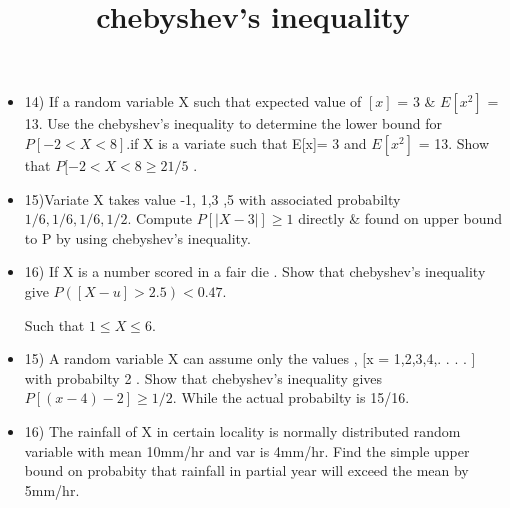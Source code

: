 \documentclass{article}
\begin{document}
\title{\Large chebyshev's inequality}

\begin{itemize}

    
    \item 14) If a random variable X such that expected value of $[x]$ = 3 & $E[x^2]$ = 13. Use the chebyshev's inequality to determine the lower bound for $P[ -2 < X < 8]$.if X is a variate such that E[x]= 3 and $E[x^2]$ = 13. Show that $P[-2 < X < 8 \geq 21/5$ . 

    \item 15)Variate X takes value -1, 1,3 ,5 with associated probabilty 
    $1/6, 1/6, 1/6, 1/2$. Compute $P[|X-3|] \geq 1$ directly & found on upper bound to P by using chebyshev's inequality.

    \item 16) If X is a number scored in a fair die . Show that chebyshev's inequality give $P([X-u] > 2.5) < 0.47$.

   Such that $1 \leq X \leq 6$.

   \item 15) A random variable X can assume only the values , [x = 1,2,3,4,. . . . ] with probabilty 2 . Show that chebyshev's inequality gives $P[(x-4)-2] \geq 1/2$. While the actual probabilty is 15/16. 

   \item  16) The rainfall of X in certain locality is normally distributed random variable with mean 10mm/hr and var is 4mm/hr. Find the simple upper bound on probabity that rainfall in partial year will exceed the mean by 5mm/hr.
\end{itemize}
\end{document}
